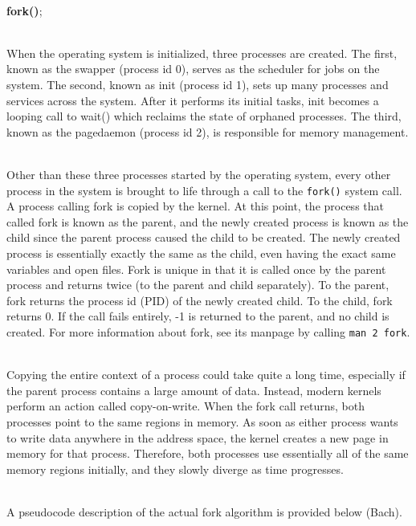 \documentclass[12pt]{extarticle}
\newenvironment{myindentpar}[1]%
 {\begin{list}{}%
         {\setlength{\leftmargin}{#1}}%
         \item[]%
 }
 {\end{list}}
\newcommand{\code}[1]{\colorbox{codegray}{\texttt{#1}}}
\begin{document}
\begin{myindentpar}{5mm}
    
    \ \\
    \textbf{fork()};
    
    \ \\
    When the operating system is initialized, three processes are created.  The first, known as the swapper (process id 0), serves as the scheduler for jobs on the system.  The second, known as init (process id 1), sets up many processes and services across the system.  After it performs its initial tasks, init becomes a looping call to wait() which reclaims the state of orphaned processes.  The third, known as the pagedaemon (process id 2), is responsible for memory management.  
    
    \ \\
    Other than these three processes started by the operating system, every other process in the system is brought to life through a call to the \code{fork()} system call.  A process calling fork is copied by the kernel.  At this point, the process that called fork is known as the parent, and the newly created process is known as the child since the parent process caused the child to be created.  The newly created process is essentially exactly the same as the child, even having the exact same variables and open files.  Fork is unique in that it is called once by the parent process and returns twice (to the parent and child separately).  To the parent, fork returns the process id (PID) of the newly created child.  To the child, fork returns 0.  If the call fails entirely, -1 is returned to the parent, and no child is created.  For more information about fork, see its manpage by calling \code{man 2 fork}.  
    
    \ \\
    Copying the entire context of a process could take quite a long time, especially if the parent process contains a large amount of data.  Instead, modern kernels perform an action called copy-on-write.  When the fork call returns, both processes point to the same regions in memory.  As soon as either process wants to write data anywhere in the address space, the kernel creates a new page in memory for that process.  Therefore, both processes use essentially all of the same memory regions initially, and they slowly diverge as time progresses.  
    
    \ \\
    A pseudocode description of the actual fork algorithm is provided below (Bach).  
    

\end{myindentpar}
\end{document}

